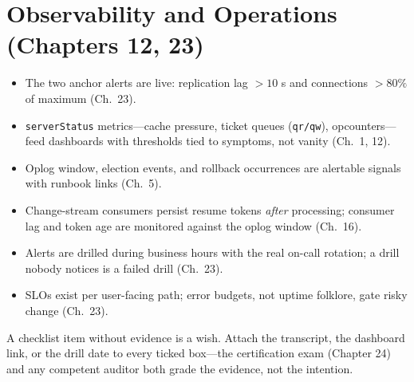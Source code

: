 \section{Observability and Operations (Chapters 12, 23)}
%
\begin{itemize}
    \item[$\square$] The two anchor alerts are live: replication lag $> 10$ s and connections $> 80\%$ of maximum (Ch.~23).
    \item[$\square$] \texttt{serverStatus} metrics---cache pressure, ticket queues (\texttt{qr/qw}), opcounters---feed dashboards with thresholds tied to symptoms, not vanity (Ch.~1, 12).
    \item[$\square$] Oplog window, election events, and rollback occurrences are alertable signals with runbook links (Ch.~5).
    \item[$\square$] Change-stream consumers persist resume tokens \emph{after} processing; consumer lag and token age are monitored against the oplog window (Ch.~16).
    \item[$\square$] Alerts are drilled during business hours with the real on-call rotation; a drill nobody notices is a failed drill (Ch.~23).
    \item[$\square$] SLOs exist per user-facing path; error budgets, not uptime folklore, gate risky change (Ch.~23).
\end{itemize}

\begin{notebox}
A checklist item without evidence is a wish. Attach the transcript, the dashboard link, or the
drill date to every ticked box---the certification exam (Chapter 24) and any competent auditor
both grade the evidence, not the intention.
\end{notebox}
